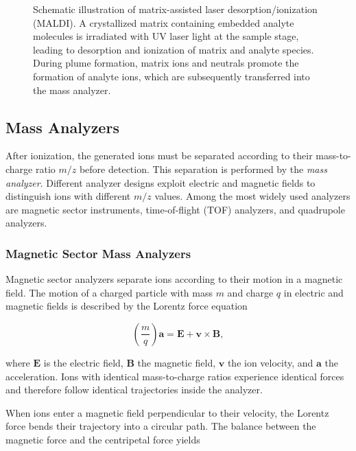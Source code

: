 \begin{figure}[H]
    \centering
    
    \caption[Schematic of MALDI ionization]{
        Schematic illustration of matrix-assisted laser desorption/ionization (MALDI). 
        A crystallized matrix containing embedded analyte molecules is irradiated with UV laser light at the sample stage, leading to desorption and ionization of matrix and analyte species. 
        During plume formation, matrix ions and neutrals promote the formation of analyte ions, which are subsequently transferred into the mass analyzer.
    }
    \label{fig:maldi-schematic}
    \cite[p.~42]{Rockwood2018}
\end{figure}
 
\subsection{Mass Analyzers}

After ionization, the generated ions must be separated according to their mass-to-charge ratio $m/z$ before detection. 
This separation is performed by the \textit{mass analyzer}. \cite[pp.~5-6]{Dass2007}
Different analyzer designs exploit electric and magnetic fields to distinguish ions with different $m/z$ values. 
Among the most widely used analyzers are magnetic sector instruments, time-of-flight (TOF) analyzers, and quadrupole analyzers. \cite[pp.~108-109]{Dass2007}

\subsubsection{Magnetic Sector Mass Analyzers}

Magnetic sector analyzers separate ions according to their motion in a magnetic field. 
The motion of a charged particle with mass $m$ and charge $q$ in electric and magnetic fields is described by the Lorentz force equation

\[
\left(\frac{m}{q}\right)\mathbf{a} = \mathbf{E} + \mathbf{v} \times \mathbf{B},
\]

where $\mathbf{E}$ is the electric field, $\mathbf{B}$ the magnetic field, $\mathbf{v}$ the ion velocity, and $\mathbf{a}$ the acceleration.
Ions with identical mass-to-charge ratios experience identical forces and therefore follow identical trajectories inside the analyzer. 

When ions enter a magnetic field perpendicular to their velocity, the Lorentz force bends their trajectory into a circular path. 
The balance between the magnetic force and the centripetal force yields

